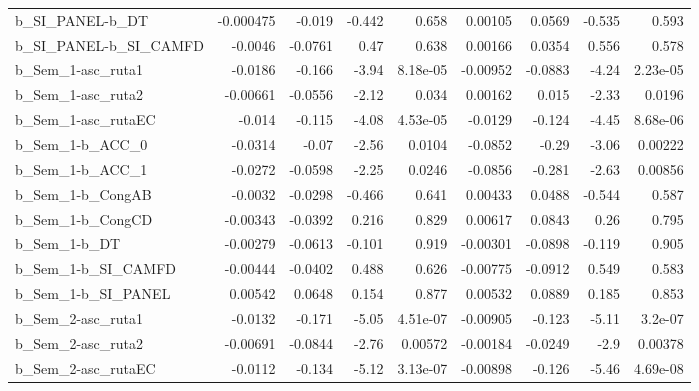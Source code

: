 \begin{tabular}{lrrrrrrrr}
b\_SI\_PANEL-b\_DT       &   -0.000475 &       -0.019 &  -0.442 &    0.658 &    0.00105 &      0.0569 &       -0.535 &         0.593 \\
b\_SI\_PANEL-b\_SI\_CAMFD &     -0.0046 &      -0.0761 &    0.47 &    0.638 &    0.00166 &      0.0354 &        0.556 &         0.578 \\
b\_Sem\_1-asc\_ruta1     &     -0.0186 &       -0.166 &   -3.94 & 8.18e-05 &   -0.00952 &     -0.0883 &        -4.24 &      2.23e-05 \\
b\_Sem\_1-asc\_ruta2     &    -0.00661 &      -0.0556 &   -2.12 &    0.034 &    0.00162 &       0.015 &        -2.33 &        0.0196 \\
b\_Sem\_1-asc\_rutaEC    &      -0.014 &       -0.115 &   -4.08 & 4.53e-05 &    -0.0129 &      -0.124 &        -4.45 &      8.68e-06 \\
b\_Sem\_1-b\_ACC\_0       &     -0.0314 &        -0.07 &   -2.56 &   0.0104 &    -0.0852 &       -0.29 &        -3.06 &       0.00222 \\
b\_Sem\_1-b\_ACC\_1       &     -0.0272 &      -0.0598 &   -2.25 &   0.0246 &    -0.0856 &      -0.281 &        -2.63 &       0.00856 \\
b\_Sem\_1-b\_CongAB      &     -0.0032 &      -0.0298 &  -0.466 &    0.641 &    0.00433 &      0.0488 &       -0.544 &         0.587 \\
b\_Sem\_1-b\_CongCD      &    -0.00343 &      -0.0392 &   0.216 &    0.829 &    0.00617 &      0.0843 &         0.26 &         0.795 \\
b\_Sem\_1-b\_DT          &    -0.00279 &      -0.0613 &  -0.101 &    0.919 &   -0.00301 &     -0.0898 &       -0.119 &         0.905 \\
b\_Sem\_1-b\_SI\_CAMFD    &    -0.00444 &      -0.0402 &   0.488 &    0.626 &   -0.00775 &     -0.0912 &        0.549 &         0.583 \\
b\_Sem\_1-b\_SI\_PANEL    &     0.00542 &       0.0648 &   0.154 &    0.877 &    0.00532 &      0.0889 &        0.185 &         0.853 \\
b\_Sem\_2-asc\_ruta1     &     -0.0132 &       -0.171 &   -5.05 & 4.51e-07 &   -0.00905 &      -0.123 &        -5.11 &       3.2e-07 \\
b\_Sem\_2-asc\_ruta2     &    -0.00691 &      -0.0844 &   -2.76 &  0.00572 &   -0.00184 &     -0.0249 &         -2.9 &       0.00378 \\
b\_Sem\_2-asc\_rutaEC    &     -0.0112 &       -0.134 &   -5.12 & 3.13e-07 &   -0.00898 &      -0.126 &        -5.46 &      4.69e-08 \\

\end{tabular}
